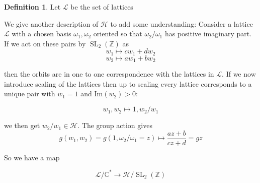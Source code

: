 \documentclass{article}
\theoremstyle{definition}
\newtheorem{definition}{Definition}[section]
\theoremstyle{definition}
\theoremstyle{definition}
\newcommand{\SLZ}{\operatorname{SL}_2(\mathbb{Z})}
\newcommand{\C}{\mathbb{C}}
\begin{document}
\begin{definition}
    Let $\mathscr{L}$ be the set of lattices
\end{definition}


We give another description of $\mathcal{H}$ to add some understanding:
\newline\newline
Consider a lattice $\mathcal{L}$ with a chosen basis $\omega_1,\omega_2$ oriented so that $\omega_2/\omega_1$ has positive imaginary part. If we act on these pairs by $\SLZ$ as 
$$w_1\mapsto cw_1+dw_2$$
$$w_2\mapsto aw_1+bw_2$$

then the orbits are in one to one correspondence with the lattices in $\mathscr{L}$.
\newline\newline
If we now introduce scaling of the lattices then up to scaling every lattice corresponds to a unique pair with $w_1=1$ and $\text{Im}(w_2)>0$:

$$w_1,w_2\mapsto 1, w_2/w_1$$

we then get $w_2/w_1\in \mathcal{H}$. The group action gives
$$g(w_1,w_2)=g(1,\omega_2/\omega_1=z)\mapsto \frac{az+b}{cz+d}=gz$$

So we have a map 

$$\mathscr{L}/\C^*\to \mathcal{H}/\SLZ $$
\end{document}
